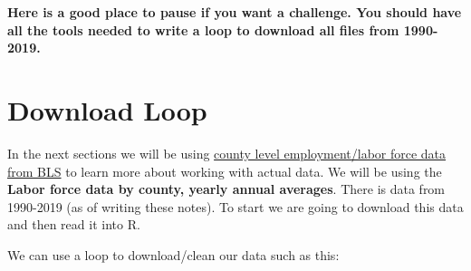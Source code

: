 \documentclass[
]{book}
\newenvironment{Shaded}{\begin{snugshade}}{\end{snugshade}}
\newcommand{\CommentTok}[1]{\textcolor[rgb]{0.56,0.35,0.01}{\textit{#1}}}
\newcommand{\FunctionTok}[1]{\textcolor[rgb]{0.00,0.00,0.00}{#1}}
\newcommand{\NormalTok}[1]{#1}
\newcommand{\OtherTok}[1]{\textcolor[rgb]{0.56,0.35,0.01}{#1}}
\newcommand{\SpecialCharTok}[1]{\textcolor[rgb]{0.00,0.00,0.00}{#1}}
\begin{document}
\begin{Shaded}
\end{Shaded}

\textbf{Here is a good place to pause if you want a challenge. You should have all the tools needed to write a loop to download all files from 1990-2019.}

\hypertarget{download-loop}{%
\section{Download Loop}\label{download-loop}}

In the next sections we will be using \href{https://www.bls.gov/lau/home.htm}{county level employment/labor force data from BLS} to learn more about working with actual data. We will be using the \textbf{Labor force data by county, yearly annual averages}. There is data from 1990-2019 (as of writing these notes). To start we are going to download this data and then read it into R.

We can use a loop to download/clean our data such as this:
\end{document}
